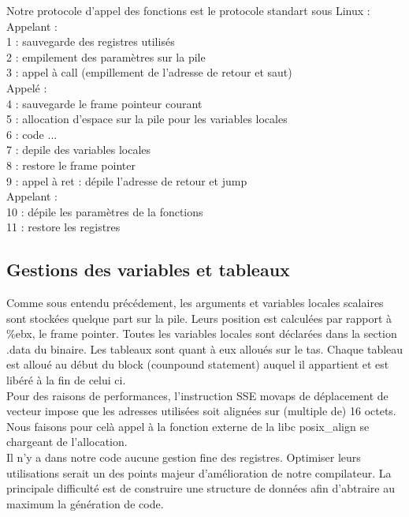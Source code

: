 \documentclass[a4paper, 11pt]{article}
\begin{document}
Notre protocole d'appel des fonctions est le protocole standart sous Linux :\\
Appelant :\\
1 : sauvegarde des registres utilisés\\
2 : empilement des paramètres sur la pile\\
3 : appel à call (empillement de l'adresse de retour et saut)\\
Appelé :\\
4 : sauvegarde le frame pointeur courant\\
5 : allocation d'espace sur la pile pour les variables locales\\
6 : code ...\\
7 : depile des variables locales\\
8 : restore le frame pointer\\
9 : appel à ret : dépile l'adresse de retour et jump\\
Appelant :\\
10 : dépile les paramètres de la fonctions\\
11 : restore les registres\\

\subsection{Gestions des variables et tableaux}

Comme sous entendu précédement, les arguments et variables locales scalaires sont stockées quelque part sur la pile. Leurs position est calculées
par rapport à \%ebx, le frame pointer.
Toutes les variables locales sont déclarées dans la section .data du binaire.
Les tableaux sont quant à eux alloués sur le tas. Chaque tableau est alloué au début du block (counpound statement) auquel il appartient et est
libéré à la fin de celui ci.\\
Pour des raisons de performances, l'instruction SSE movaps de déplacement de vecteur impose
que les adresses utilisées soit alignées sur (multiple de) 16 octets. Nous faisons pour celà appel à la fonction externe de la libc posix\_align
se chargeant de l'allocation.\\

Il n'y a dans notre code aucune gestion fine des registres. Optimiser leurs utilisations serait un des points majeur d'amélioration de notre
compilateur. La principale difficulté est de construire une structure de données afin d'abtraire au maximum la génération de code.
\end{document}
